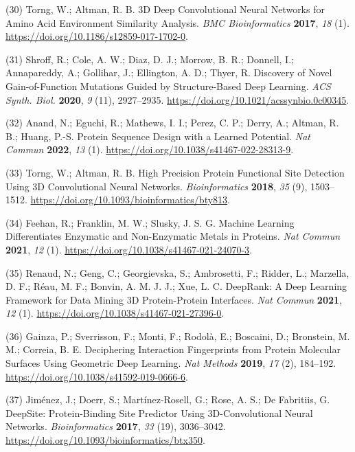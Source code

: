 \documentclass[  ASAPversion,
  ,
  9pt]{elife}
\newenvironment{cslreferences}%
  {}%
  {\par}
\begin{document}
\begin{cslreferences}
\leavevmode\hypertarget{ref-ls5kyxZ3}{}%
(30) Torng, W.; Altman, R. B. 3D Deep Convolutional Neural Networks for Amino Acid Environment Similarity Analysis. \emph{BMC Bioinformatics} \textbf{2017}, \emph{18} (1). \url{https://doi.org/10.1186/s12859-017-1702-0}.

\leavevmode\hypertarget{ref-F7P74Etp}{}%
(31) Shroff, R.; Cole, A. W.; Diaz, D. J.; Morrow, B. R.; Donnell, I.; Annapareddy, A.; Gollihar, J.; Ellington, A. D.; Thyer, R. Discovery of Novel Gain-of-Function Mutations Guided by Structure-Based Deep Learning. \emph{ACS Synth. Biol.} \textbf{2020}, \emph{9} (11), 2927--2935. \url{https://doi.org/10.1021/acssynbio.0c00345}.

\leavevmode\hypertarget{ref-6szq3cwi}{}%
(32) Anand, N.; Eguchi, R.; Mathews, I. I.; Perez, C. P.; Derry, A.; Altman, R. B.; Huang, P.-S. Protein Sequence Design with a Learned Potential. \emph{Nat Commun} \textbf{2022}, \emph{13} (1). \url{https://doi.org/10.1038/s41467-022-28313-9}.

\leavevmode\hypertarget{ref-SGggOw7Z}{}%
(33) Torng, W.; Altman, R. B. High Precision Protein Functional Site Detection Using 3D Convolutional Neural Networks. \emph{Bioinformatics} \textbf{2018}, \emph{35} (9), 1503--1512. \url{https://doi.org/10.1093/bioinformatics/bty813}.

\leavevmode\hypertarget{ref-MKP16DSu}{}%
(34) Feehan, R.; Franklin, M. W.; Slusky, J. S. G. Machine Learning Differentiates Enzymatic and Non-Enzymatic Metals in Proteins. \emph{Nat Commun} \textbf{2021}, \emph{12} (1). \url{https://doi.org/10.1038/s41467-021-24070-3}.

\leavevmode\hypertarget{ref-q224Kv8w}{}%
(35) Renaud, N.; Geng, C.; Georgievska, S.; Ambrosetti, F.; Ridder, L.; Marzella, D. F.; Réau, M. F.; Bonvin, A. M. J. J.; Xue, L. C. DeepRank: A Deep Learning Framework for Data Mining 3D Protein-Protein Interfaces. \emph{Nat Commun} \textbf{2021}, \emph{12} (1). \url{https://doi.org/10.1038/s41467-021-27396-0}.

\leavevmode\hypertarget{ref-yBhqGkBa}{}%
(36) Gainza, P.; Sverrisson, F.; Monti, F.; Rodolà, E.; Boscaini, D.; Bronstein, M. M.; Correia, B. E. Deciphering Interaction Fingerprints from Protein Molecular Surfaces Using Geometric Deep Learning. \emph{Nat Methods} \textbf{2019}, \emph{17} (2), 184--192. \url{https://doi.org/10.1038/s41592-019-0666-6}.

\leavevmode\hypertarget{ref-Gq7n6vhH}{}%
(37) Jiménez, J.; Doerr, S.; Martínez-Rosell, G.; Rose, A. S.; De Fabritiis, G. DeepSite: Protein-Binding Site Predictor Using 3D-Convolutional Neural Networks. \emph{Bioinformatics} \textbf{2017}, \emph{33} (19), 3036--3042. \url{https://doi.org/10.1093/bioinformatics/btx350}.


\end{cslreferences}
\end{document}
